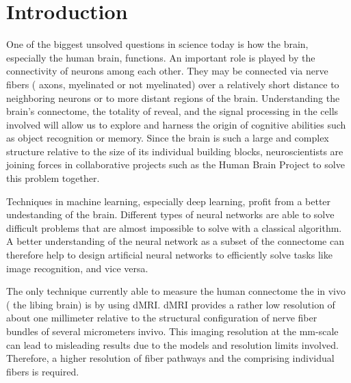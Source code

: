 % 
% 
% 
\newpage\null\thispagestyle{empty}\newpage
\clearpage{\thispagestyle{empty}\cleardoublepage}
\cleardoublepage
% 
% 
% 
\setcounter{chapter}{0}
\chapter{Introduction}
\label{sec:intro}
% 
One of the biggest unsolved questions in science today is how the brain, especially the human brain, functions.
An important role is played by the connectivity of neurons among each other.
They may be connected via nerve fibers (\ie{} axons, myelinated or not myelinated) over a relatively short distance to neighboring neurons or to more distant regions of the brain.
Understanding the brain's connectome, \ie{} the totality of reveal, and the signal processing in the cells involved will allow us to explore and harness the origin of cognitive abilities such as object recognition or memory.
Since the brain is such a large and complex structure relative to the size of its individual building blocks, neuroscientists are joining forces in collaborative projects such as the Human Brain Project to solve this problem together. \cite{Markram2006, Shen2012, Amunts2013, Amunts2016}
\par
% 
Techniques in machine learning, especially deep learning, profit from a better undestanding of the brain.
Different types of neural networks are able to solve difficult problems that are almost impossible to solve with a classical algorithm.
A better understanding of the neural network as a subset of the connectome can therefore help to design artificial neural networks to efficiently solve tasks like image recognition, and vice versa. \cite{murphy2013machine, Goodfellow-et-al-2016}
\par
% 
The only technique currently able to measure the human connectome the in vivo (\ie{} the libing brain) is by using \ac{dMRI}.
\ac{dMRI} provides a rather low resolution of about one millimeter relative to the structural configuration of nerve fiber bundles of several micrometers invivo.
This imaging resolution at the \si{\milli\meter}-scale can lead to misleading results due to the models and resolution limits involved.
Therefore, a higher resolution of fiber pathways and the comprising individual fibers is required.
